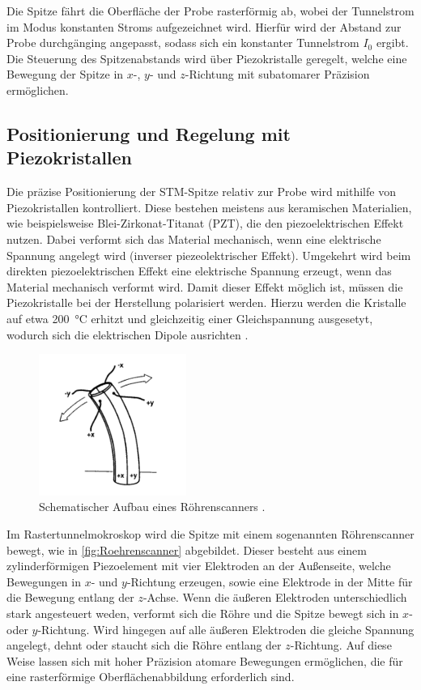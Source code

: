 Die Spitze fährt die Oberfläche der Probe rasterförmig ab, wobei der Tunnelstrom im Modus konstanten Stroms aufgezeichnet wird. 
Hierfür wird der Abstand zur Probe durchgänging angepasst, sodass sich ein konstanter Tunnelstrom $I_0$ ergibt. 
Die Steuerung des Spitzenabstands wird über Piezokristalle geregelt, welche eine Bewegung der Spitze in $x$-, $y$- und $z$-Richtung mit subatomarer Präzision ermöglichen. 

\subsection{Positionierung und Regelung mit Piezokristallen}
\label{sec:Piezokristalle}
Die präzise Positionierung der STM-Spitze relativ zur Probe wird mithilfe von Piezokristallen kontrolliert.
Diese bestehen meistens aus keramischen Materialien, wie beispielsweise Blei-Zirkonat-Titanat (PZT), die den piezoelektrischen Effekt nutzen. 
Dabei verformt sich das Material mechanisch, wenn eine elektrische Spannung angelegt wird (inverser piezeolektrischer Effekt). 
Umgekehrt wird beim direkten piezoelektrischen Effekt eine elektrische Spannung erzeugt, wenn das Material mechanisch verformt wird.
Damit dieser Effekt möglich ist, müssen die Piezokristalle bei der Herstellung polarisiert werden. 
Hierzu werden die Kristalle auf etwa \SI{200}{\celsius} erhitzt und gleichzeitig einer Gleichspannung ausgesetyt, wodurch sich die elektrischen Dipole ausrichten \cite{GuidesScanningProbeMicroscope}.\\
\begin{figure}
    \centering
    \includegraphics[width=0.43\textwidth]{Bilder/Roehrenscanner.png}
    \caption{Schematischer Aufbau eines Röhrenscanners \cite{GuidesScanningProbeMicroscope}.}
    \label{fig:Roehrenscanner}
\end{figure}
Im Rastertunnelmokroskop wird die Spitze mit einem sogenannten Röhrenscanner bewegt, wie in \autoref{fig:Roehrenscanner} abgebildet. 
Dieser besteht aus einem zylinderförmigen Piezoelement mit vier Elektroden an der Außenseite, welche Bewegungen in $x$- und $y$-Richtung erzeugen, sowie eine  Elektrode in der Mitte für die Bewegung entlang der $z$-Achse. 
Wenn die äußeren Elektroden unterschiedlich stark angesteuert weden, verformt sich die Röhre und die Spitze bewegt sich in $x$- oder $y$-Richtung.
Wird hingegen auf alle äußeren Elektroden die gleiche Spannung angelegt, dehnt oder staucht sich die Röhre entlang der $z$-Richtung.
Auf diese Weise lassen sich mit hoher Präzision atomare Bewegungen ermöglichen, die für eine rasterförmige Oberflächenabbildung erforderlich sind.
\FloatBarrier

